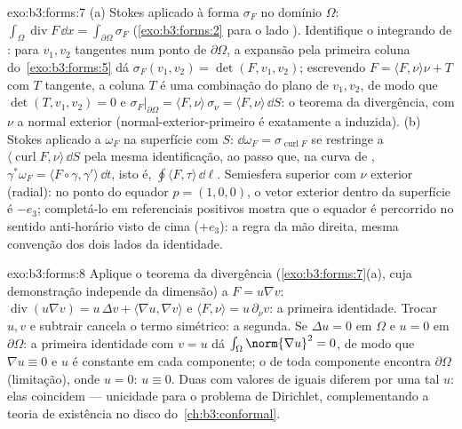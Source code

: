 \begin{solution}{exo:b3:forms:7}
(a) Stokes aplicado à forma  $\sigma_F$ no
domínio  $\Omega$:
$\int_\Omega\operatorname{div}F\,\dd x =
\int_{\partial\Omega}\sigma_F$ (\cref{exo:b3:forms:2} para
o lado ). Identifique o integrando de : para
$v_1, v_2$ tangentes num ponto de $\partial\Omega$, a
expansão pela primeira coluna do~\cref{exo:b3:forms:5} dá
$\sigma_F(v_1, v_2) = \det(F, v_1, v_2)$; escrevendo $F =
\langle F, \nu\rangle\nu + T$ com $T$ tangente, a coluna
$T$ é uma combinação do plano de $v_1, v_2$, de modo que $\det(T,
v_1, v_2) = 0$ e
$\sigma_F\vert_{\partial\Omega} = \langle F,
\nu\rangle\,\sigma_\nu = \langle F, \nu\rangle\,\dd S$: o
teorema da divergência, com $\nu$ a normal exterior
(normal-exterior-primeiro é exatamente a  induzida).
(b) Stokes aplicado a $\omega_F$ na
superfície com  $S$: $\dd\omega_F =
\sigma_{\operatorname{curl}F}$ se restringe a
$\langle\operatorname{curl}F, \nu\rangle\,\dd S$ pela mesma
identificação, ao passo que, na curva de ,
$\gamma^*\omega_F = \langle F\circ\gamma,
\gamma'\rangle\,\dd t$, isto é, $\oint\langle F,
\tau\rangle\,\dd\ell$. Semiesfera superior com $\nu$ exterior
(radial): no ponto do equador $p = (1,0,0)$, o
vetor exterior dentro da superfície é $-e_3$; completá-lo
em referenciais positivos mostra que o equador é percorrido no sentido
anti-horário visto de cima ($+e_3$): a regra da mão
direita, mesma convenção dos dois lados da identidade.
\end{solution}

\begin{solution}{exo:b3:forms:8}
Aplique o teorema da divergência (\cref{exo:b3:forms:7}(a),
cuja demonstração independe da dimensão) a $F = u\nabla v$:
$\operatorname{div}(u\nabla v) = u\,\Delta v + \langle\nabla
u, \nabla v\rangle$ e $\langle F, \nu\rangle =
u\,\partial_\nu v$: a primeira identidade. Trocar $u, v$ e
subtrair cancela o termo simétrico: a segunda. Se
$\Delta u = 0$ em $\Omega$ e $u = 0$ em $\partial\Omega$:
a primeira identidade com $v = u$ dá
$\int_\Omega\norm{\nabla u}^2 = 0$, de modo que $\nabla u \equiv 0$
e $u$ é constante em cada componente; o  de toda componente
encontra $\partial\Omega$ (limitação), onde $u = 0$:
$u \equiv 0$. Duas  com valores de 
iguais diferem por uma tal $u$: elas coincidem --- unicidade
para o problema de Dirichlet, complementando a teoria de existência
no disco do~\cref{ch:b3:conformal}.
\end{solution}

